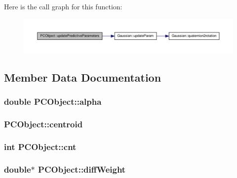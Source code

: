 \-Here is the call graph for this function\-:
\nopagebreak
\begin{figure}[H]
\begin{center}
\leavevmode
\includegraphics[width=350pt]{class_p_c_object_ae117d9276dd14490027029e8b87e150f_cgraph}
\end{center}
\end{figure}




\subsection{\-Member \-Data \-Documentation}
\hypertarget{class_p_c_object_ac94a79d35dece547fab98be2b70e9604}{
\subsubsection[{alpha}]{\setlength{\rightskip}{0pt plus 5cm}double {\bf \-P\-C\-Object\-::alpha}}}\label{class_p_c_object_ac94a79d35dece547fab98be2b70e9604}
\hypertarget{class_p_c_object_a827d54b95fd8fbe64bd4f0fe7a7c1c80}{
\subsubsection[{centroid}]{ {\bf \-P\-C\-Object\-::centroid}}}\label{class_p_c_object_a827d54b95fd8fbe64bd4f0fe7a7c1c80}
\hypertarget{class_p_c_object_a1e854b1f05424e21b57571c4d5d3a639}{
\subsubsection[{cnt}]{\setlength{\rightskip}{0pt plus 5cm}int {\bf \-P\-C\-Object\-::cnt}}}\label{class_p_c_object_a1e854b1f05424e21b57571c4d5d3a639}
\hypertarget{class_p_c_object_ae08580ed200d25aa8304fde6f924c9f3}{
\subsubsection[{diff\-Weight}]{\setlength{\rightskip}{0pt plus 5cm}double$\ast$ {\bf \-P\-C\-Object\-::diff\-Weight}}}\label{class_p_c_object_ae08580ed200d25aa8304fde6f924c9f3}
